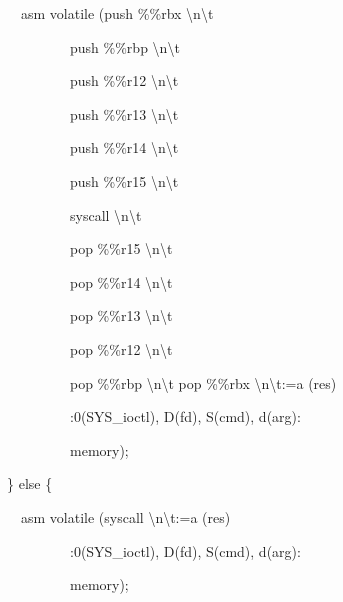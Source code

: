 \ \ \ \ asm volatile ({\textquotedbl}push \%\%rbx {\textbackslash}n{\textbackslash}t{\textquotedbl}

\ \ \ \ \ \  \ \ \ \ \ {\textquotedbl}push \%\%rbp {\textbackslash}n{\textbackslash}t{\textquotedbl}

\ \ \ \ \ \  \ \ \ \ \ {\textquotedbl}push \%\%r12 {\textbackslash}n{\textbackslash}t{\textquotedbl}

\ \ \ \ \ \  \ \ \ \ \ {\textquotedbl}push \%\%r13 {\textbackslash}n{\textbackslash}t{\textquotedbl}

\ \ \ \ \ \  \ \ \ \ \ {\textquotedbl}push \%\%r14 {\textbackslash}n{\textbackslash}t{\textquotedbl}

\ \ \ \ \ \  \ \ \ \ \ {\textquotedbl}push \%\%r15 {\textbackslash}n{\textbackslash}t{\textquotedbl}

\ \ \ \ \ \  \ \ \ \ \ {\textquotedbl}syscall {\textbackslash}n{\textbackslash}t{\textquotedbl}

\ \ \ \ \ \  \ \ \ \ \ {\textquotedbl}pop \%\%r15 {\textbackslash}n{\textbackslash}t{\textquotedbl}

\ \ \ \ \ \  \ \ \ \ \ {\textquotedbl}pop \%\%r14 {\textbackslash}n{\textbackslash}t{\textquotedbl}

\ \ \ \ \ \  \ \ \ \ \ {\textquotedbl}pop \%\%r13 {\textbackslash}n{\textbackslash}t{\textquotedbl}

\ \ \ \ \ \  \ \ \ \ \ {\textquotedbl}pop \%\%r12 {\textbackslash}n{\textbackslash}t{\textquotedbl}

\ \ \ \ \ \  \ \ \ \ \ {\textquotedbl}pop \%\%rbp {\textbackslash}n{\textbackslash}t{\textquotedbl} {\textquotedbl}pop \%\%rbx {\textbackslash}n{\textbackslash}t{\textquotedbl}:{\textquotedbl}=a{\textquotedbl} (res)

\ \ \ \ \ \  \ \ \ \ \ :{\textquotedbl}0{\textquotedbl}(SYS\_ioctl), {\textquotedbl}D{\textquotedbl}(fd), {\textquotedbl}S{\textquotedbl}(cmd), {\textquotedbl}d{\textquotedbl}(arg):

\ \ \ \ \ \  \ \ \ \ \ {\textquotedbl}memory{\textquotedbl});

\ \ \} else \{

\ \ \ \ asm volatile ({\textquotedbl}syscall {\textbackslash}n{\textbackslash}t{\textquotedbl}:{\textquotedbl}=a{\textquotedbl} (res)

\ \ \ \ \ \  \ \ \ \ \ :{\textquotedbl}0{\textquotedbl}(SYS\_ioctl), {\textquotedbl}D{\textquotedbl}(fd), {\textquotedbl}S{\textquotedbl}(cmd), {\textquotedbl}d{\textquotedbl}(arg):

\ \ \ \ \ \  \ \ \ \ \ {\textquotedbl}memory{\textquotedbl});


